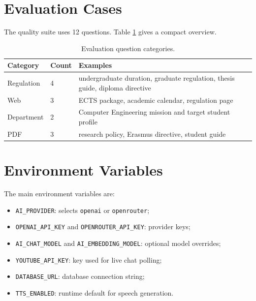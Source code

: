 \section{Evaluation Cases}

The quality suite uses 12 questions. Table \ref{tab:evaluation-cases} gives a compact overview.

\begin{table}[!htbp]
    \centering
    \caption{\label{tab:evaluation-cases}Evaluation question categories.}
    \begin{tabularx}{\textwidth}{llX}
        \toprule
        Category & Count & Examples \\
        \midrule
        Regulation & 4 & undergraduate duration, graduate regulation, thesis guide, diploma directive \\
        Web & 3 & ECTS package, academic calendar, regulation page \\
        Department & 2 & Computer Engineering mission and target student profile \\
        PDF & 3 & research policy, Erasmus directive, student guide \\
        \bottomrule
    \end{tabularx}
\end{table}

\section{Environment Variables}

The main environment variables are:

\begin{itemize}
    \item \texttt{AI\_PROVIDER}: selects \texttt{openai} or \texttt{openrouter};
    \item \texttt{OPENAI\_API\_KEY} and \texttt{OPENROUTER\_API\_KEY}: provider keys;
    \item \texttt{AI\_CHAT\_MODEL} and \texttt{AI\_EMBEDDING\_MODEL}: optional model overrides;
    \item \texttt{YOUTUBE\_API\_KEY}: key used for live chat polling;
    \item \texttt{DATABASE\_URL}: database connection string;
    \item \texttt{TTS\_ENABLED}: runtime default for speech generation.
\end{itemize}
